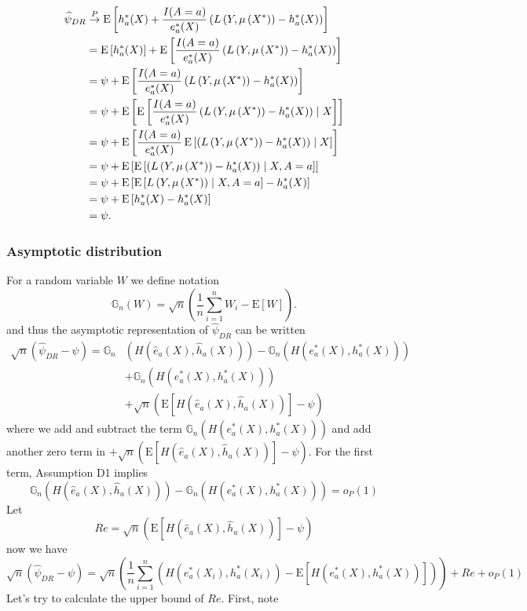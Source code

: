 $$
\begin{aligned}
\widehat{\psi}_{DR} & \stackrel{P}{\rightarrow}  \operatorname{E}\left[h^*_a(X)+\frac{I(A = a)}{e^*_a(X)}\left(L\left(Y, \mu\left(X^*\right)\right)-h^*_a(X)\right)\right] \\
&= \operatorname{E}\left[h^*_a(X)\right]+\operatorname{E}\left[\frac{I(A = a)}{e^*_a(X)}\left(L\left(Y, \mu\left(X^*\right)\right)-h^*_a(X)\right)\right] \\
& =\psi+\operatorname{E}\left[\frac{I(A = a)}{e^*_a(X)}\left(L\left(Y, \mu\left(X^*\right)\right)-h^*_a(X)\right)\right] \\
& =\psi+\operatorname{E}\left[\operatorname{E}\left[\frac{I(A = a)}{e^*_a(X)}\left(L\left(Y, \mu\left(X^*\right)\right)-h^*_a(X)\right) \mid X \right]\right] \\
& =\psi+\operatorname{E}\left[\frac{I(A = a)}{e^*_a(X)} \operatorname{E}\left[\left(L\left(Y, \mu\left(X^*\right)\right)-h^*_a(X)\right) \mid X \right]\right] \\
& =\psi+\operatorname{E}\left[\operatorname{E}\left[\left(L\left(Y, \mu\left(X^*\right)\right)-h^*_a(X)\right) \mid X, A=a \right]\right] \\
& =\psi+\operatorname{E}\left[\operatorname{E}\left[L\left(Y, \mu\left(X^*\right)\right) \mid X, A=a  \right] -h^*_a(X) \right] \\
& =\psi+\operatorname{E}\left[h^*_a(X) -h^*_a(X) \right] \\
& =\psi .
\end{aligned}
$$

\subsubsection{Asymptotic distribution}

For a random variable $W$ we define notation
$$
\mathbb{G}_n(W)=\sqrt{n}\left(\frac{1}{n} \sum_{i=1}^n W_i-\mathrm{E}[W]\right) .
$$
and thus the asymptotic representation of $\widehat{\psi}_{DR}$ can be written
$$
\begin{aligned}
\sqrt{n}\left(\widehat{\psi}_{D R}-\psi\right)=\mathbb{G}_n &(H(\widehat{e}_a(X), \widehat{h}_a(X)))-\mathbb{G}_n\left(H\left(e^*_a(X), h^*_a(X)\right)\right) \\
& +\mathbb{G}_n\left(H\left(e^*_a(X), h^*_a(X)\right)\right) \\
& +\sqrt{n}(\mathrm{E}[H(\widehat{e}_a(X), \widehat{h}_a(X))]-\psi)
\end{aligned}
$$
where we add and subtract the term $\mathbb{G}_n\left(H\left(e^*_a(X), h^*_a(X)\right)\right)$ and add another zero term in $+\sqrt{n}(\mathrm{E}[H(\widehat{e}_a(X), \widehat{h}_a(X))]-\psi)$. For the first term, Assumption D1 implies
$$
\mathbb{G}_n(H(\widehat{e}_a(X), \widehat{h}_a(X)))-\mathbb{G}_n\left(H\left(e^*_a(X), h^*_a(X)\right)\right)=o_P(1)
$$
Let 
$$
Re=\sqrt{n}(\mathrm{E}[H(\widehat{e}_a(X), \widehat{h}_a(X))]-\psi)
$$
now we have
$$
\sqrt{n}\left(\widehat{\psi}_{DR}-\psi\right)=\sqrt{n}\left(\frac{1}{n} \sum_{i=1}^n\left(H\left(e^*_a(X_i), h^*_a(X_i)\right)-\mathrm{E}\left[H\left(e^*_a(X), h^*_a(X)\right)\right]\right)\right)+R e+o_P(1)
$$
Let's try to calculate the upper bound of $Re$. First, note


